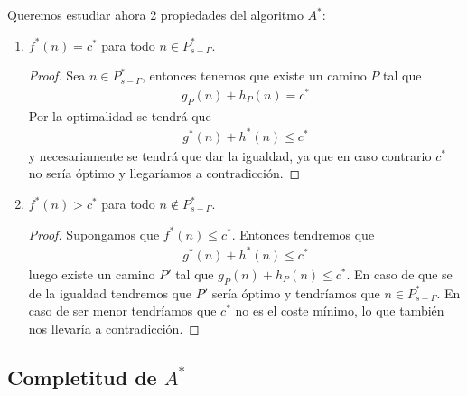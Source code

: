 \begin{propiedades}
    Queremos estudiar ahora 2 propiedades del algoritmo $A^*$:
    \begin{enumerate}
        \item $f^*(n) = c^*$ para todo $n\in P^*_{s-\Gamma}$.
        \begin{proof}
            Sea $n\in P^*_{s-\Gamma}$, entonces tenemos que existe un camino $P$ tal que
            \begin{gather*}
                g_P(n) + h_P(n) = c^*
            \end{gather*}
            Por la optimalidad se tendrá que 
            \begin{gather*}
                g^*(n) + h^*(n) \leq c^*
            \end{gather*}
            y necesariamente se tendrá que dar la igualdad, ya que en caso contrario $c^*$ no sería óptimo y llegaríamos a contradicción.
        \end{proof}
        \item $f^*(n) > c^*$ para todo $n\notin P^*_{s-\Gamma}$.
        \begin{proof}
            Supongamos que $f^*(n)\leq c^*$. Entonces tendremos que 
            \begin{gather*}
                g^*(n) + h^*(n) \leq c^*
            \end{gather*}
            luego existe un camino $P'$ tal que $g_P(n) + h_P(n) \leq c^*$. En caso de que se de la igualdad tendremos que $P'$ sería óptimo y tendríamos que $n\in P^*_{s-\Gamma}$. En caso de ser menor tendríamos que $c^*$ no es el coste mínimo, lo que también nos llevaría a contradicción.
        \end{proof}
    \end{enumerate}
\end{propiedades}

\subsection{Completitud de $A^*$}


